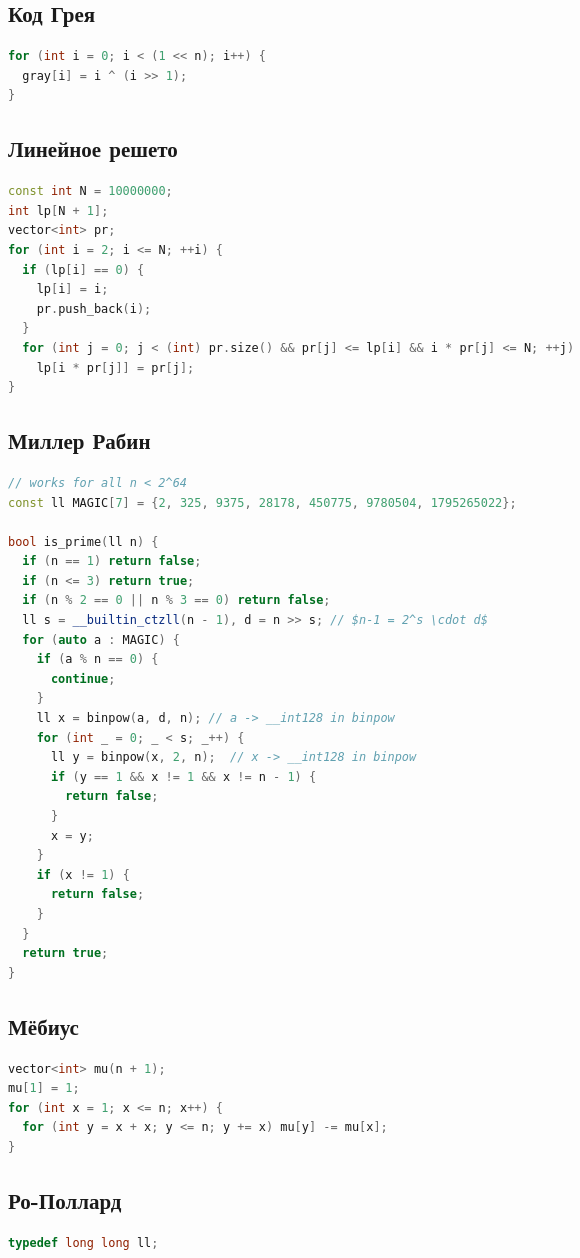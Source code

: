 \documentclass[9pt,a4paper,landscape,twosided]{extarticle}
\begin{document}
\begin{multicols*}{3}
\subsection{Код Грея}
\begin{lstlisting}[language=C++]
for (int i = 0; i < (1 << n); i++) {
  gray[i] = i ^ (i >> 1);
}
\end{lstlisting}

\subsection{Линейное решето}
\begin{lstlisting}[language=C++]
const int N = 10000000;
int lp[N + 1];
vector<int> pr;
for (int i = 2; i <= N; ++i) {
  if (lp[i] == 0) {
    lp[i] = i;
    pr.push_back(i);
  }
  for (int j = 0; j < (int) pr.size() && pr[j] <= lp[i] && i * pr[j] <= N; ++j)
    lp[i * pr[j]] = pr[j];
}
\end{lstlisting}

\subsection{Миллер Рабин}
\begin{lstlisting}[language=C++]
// works for all n < 2^64
const ll MAGIC[7] = {2, 325, 9375, 28178, 450775, 9780504, 1795265022};

bool is_prime(ll n) {
  if (n == 1) return false;
  if (n <= 3) return true;
  if (n % 2 == 0 || n % 3 == 0) return false;
  ll s = __builtin_ctzll(n - 1), d = n >> s; // $n-1 = 2^s \cdot d$
  for (auto a : MAGIC) {
    if (a % n == 0) {
      continue;
    }
    ll x = binpow(a, d, n); // a -> __int128 in binpow
    for (int _ = 0; _ < s; _++) {
      ll y = binpow(x, 2, n);  // x -> __int128 in binpow
      if (y == 1 && x != 1 && x != n - 1) {
        return false;
      }
      x = y;
    }
    if (x != 1) {
      return false;
    }
  }
  return true;
}
\end{lstlisting}

\subsection{Мёбиус}
\begin{lstlisting}[language=C++]
vector<int> mu(n + 1);
mu[1] = 1;
for (int x = 1; x <= n; x++) {
  for (int y = x + x; y <= n; y += x) mu[y] -= mu[x];
}
\end{lstlisting}

\subsection{Ро-Поллард}
\begin{lstlisting}[language=C++]
typedef long long ll;


\end{lstlisting}
\end{multicols*}
\end{document}
